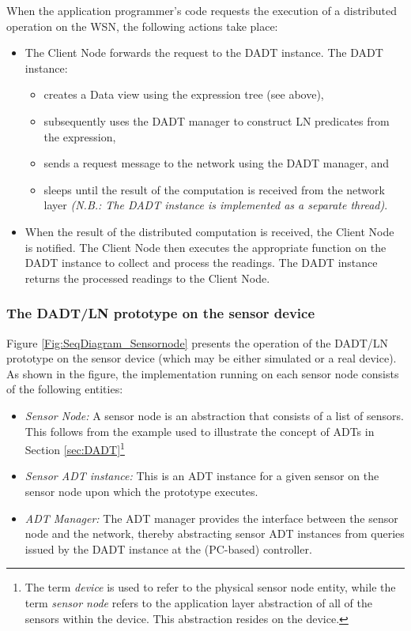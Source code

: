 When the application programmer's code requests the execution of a distributed operation
on the WSN, the following actions take place:

\begin{itemize}
  \item The Client Node forwards the request to the DADT instance. The DADT instance:
  \begin{itemize} 
    \item creates a Data
  view using the expression tree (see above),
  \item subsequently uses the DADT 
  manager to construct LN predicates from the expression, 
  \item sends a
  request message to the network using the DADT manager, and
  \item sleeps until the result of the computation is
  received from the network layer \emph{(N.B.: The DADT instance is implemented as a
  separate thread)}.
  \end{itemize}
  \item When the result of the distributed computation is received, the Client Node is notified. 
 The Client Node then executes
  the appropriate function on the DADT instance to collect and process the
  readings. The DADT instance returns the processed readings to the Client Node.
\end{itemize}


\subsubsection{The DADT/LN prototype on the sensor device} \label{subsubsec:DADTLNSensorDevice}

Figure \ref{Fig:SeqDiagram_Sensornode} presents the operation of the DADT/LN
prototype on the sensor device (which may be either simulated or a real
device). As shown in the figure, the implementation running on each sensor node 
consists of the following entities:

\begin{itemize}
  \item \emph{Sensor Node:} A sensor node is an abstraction that consists of a
  list of sensors. This follows from the example used to illustrate the concept
  of ADTs in Section \ref{sec:DADT}\footnote{The term \emph{device} is used to
  refer to the physical sensor node entity, while the term \emph{sensor node}
  refers to the application layer abstraction of all of the sensors within the
  device. This abstraction resides on the device.}
  \item \emph{Sensor ADT instance:} This is an ADT instance for a given sensor
  on the sensor node upon which the prototype executes. 
  \item \emph{ADT Manager:} The ADT manager provides the interface between the
  sensor node and the network, thereby abstracting sensor ADT instances from
  queries issued by the DADT instance at the (PC-based) controller.
\end{itemize}

